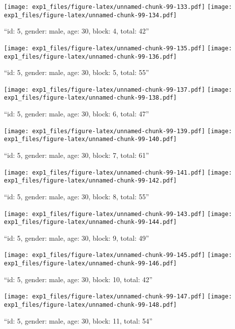 \documentclass[,]{article}
\begin{document}
\texttt{[image: exp1\_files/figure-latex/unnamed-chunk-99-133.pdf]}
\texttt{[image: exp1\_files/figure-latex/unnamed-chunk-99-134.pdf]}

\newpage
[1] 

``id: 5, gender: male, age: 30, block: 4, total: 42''

\texttt{[image: exp1\_files/figure-latex/unnamed-chunk-99-135.pdf]}
\texttt{[image: exp1\_files/figure-latex/unnamed-chunk-99-136.pdf]}

\newpage
[1] 

``id: 5, gender: male, age: 30, block: 5, total: 55''

\texttt{[image: exp1\_files/figure-latex/unnamed-chunk-99-137.pdf]}
\texttt{[image: exp1\_files/figure-latex/unnamed-chunk-99-138.pdf]}

\newpage
[1] 

``id: 5, gender: male, age: 30, block: 6, total: 47''

\texttt{[image: exp1\_files/figure-latex/unnamed-chunk-99-139.pdf]}
\texttt{[image: exp1\_files/figure-latex/unnamed-chunk-99-140.pdf]}

\newpage
[1] 

``id: 5, gender: male, age: 30, block: 7, total: 61''

\texttt{[image: exp1\_files/figure-latex/unnamed-chunk-99-141.pdf]}
\texttt{[image: exp1\_files/figure-latex/unnamed-chunk-99-142.pdf]}

\newpage
[1] 

``id: 5, gender: male, age: 30, block: 8, total: 55''

\texttt{[image: exp1\_files/figure-latex/unnamed-chunk-99-143.pdf]}
\texttt{[image: exp1\_files/figure-latex/unnamed-chunk-99-144.pdf]}

\newpage
[1] 

``id: 5, gender: male, age: 30, block: 9, total: 49''

\texttt{[image: exp1\_files/figure-latex/unnamed-chunk-99-145.pdf]}
\texttt{[image: exp1\_files/figure-latex/unnamed-chunk-99-146.pdf]}

\newpage
[1] 

``id: 5, gender: male, age: 30, block: 10, total: 42''

\texttt{[image: exp1\_files/figure-latex/unnamed-chunk-99-147.pdf]}
\texttt{[image: exp1\_files/figure-latex/unnamed-chunk-99-148.pdf]}

\newpage
[1] 

``id: 5, gender: male, age: 30, block: 11, total: 54''
\end{document}
